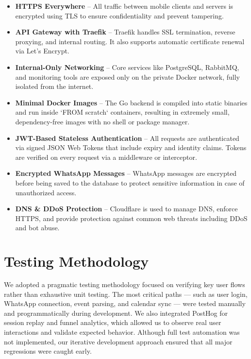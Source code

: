 \begin{itemize}
    \item \textbf{HTTPS Everywhere} – All traffic between mobile clients and servers is encrypted using TLS to ensure confidentiality and prevent tampering.
    \item \textbf{API Gateway with Traefik} – Traefik handles SSL termination, reverse proxying, and internal routing. It also supports automatic certificate renewal via Let's Encrypt.
    \item \textbf{Internal-Only Networking} – Core services like PostgreSQL, RabbitMQ, and monitoring tools are exposed only on the private Docker network, fully isolated from the internet.
    \item \textbf{Minimal Docker Images} – The Go backend is compiled into static binaries and run inside `FROM scratch` containers, resulting in extremely small, dependency-free images with no shell or package manager.
    \item \textbf{JWT-Based Stateless Authentication} – All requests are authenticated via signed JSON Web Tokens that include expiry and identity claims. Tokens are verified on every request via a middleware or interceptor.
    \item \textbf{Encrypted WhatsApp Messages} – WhatsApp messages are encrypted before being saved to the database to protect sensitive information in case of unauthorized access.
    \item \textbf{DNS \& DDoS Protection} – Cloudflare is used to manage DNS, enforce HTTPS, and provide protection against common web threats including DDoS and bot abuse.
\end{itemize}


\section{Testing Methodology}

We adopted a pragmatic testing methodology focused on verifying key user flows rather than exhaustive unit testing. The most critical paths — such as user login, WhatsApp connection, event parsing, and calendar sync — were tested manually and programmatically during development. We also integrated PostHog for session replay and funnel analytics, which allowed us to observe real user interactions and validate expected behavior. Although full test automation was not implemented, our iterative development approach ensured that all major regressions were caught early.


